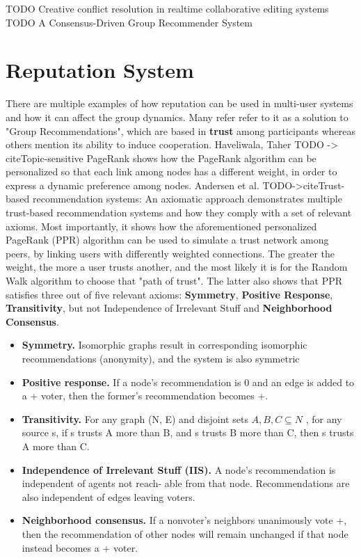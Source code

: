 TODO Creative conflict resolution in realtime collaborative editing systems
TODO A Consensus-Driven Group Recommender System

\section{Reputation System}\label{sec:rep-sys-sota}

There are multiple examples of how reputation can be used in multi-user systems and how it can affect the group dynamics. Many refer refer to it as a solution to "Group Recommendations", which are based in \textbf{trust} among participants whereas others mention its ability to induce cooperation. Haveliwala, Taher TODO -> cite{Topic-sensitive PageRank} shows how the PageRank algorithm can be personalized so that each link among nodes has a different weight, in order to express a dynamic preference among nodes. Andersen et al. TODO->cite{Trust-based recommendation systems: An axiomatic approach} demonstrates multiple trust-based recommendation systems and how they comply with a set of relevant axioms. Most importantly, it shows how the aforementioned personalized PageRank (PPR) algorithm can be used to simulate a trust network among peers, by linking users with differently weighted connections. The greater the weight, the more a user trusts another, and the most likely it is for the Random Walk algorithm to choose that "path of trust". The latter also shows that PPR satisfies three out of five relevant axioms: \textbf{Symmetry}, \textbf{Positive Response}, \textbf{Transitivity}, but not Independence of Irrelevant Stuff and \textbf{Neighborhood Consensus}.
\begin{itemize}
    \item \textbf{Symmetry.} Isomorphic graphs result in corresponding isomorphic recommendations (anonymity), and the system is also symmetric
    \item \textbf{Positive response.} If a node’s recommendation is 0 and an edge is added to a + voter, then the former’s recommendation becomes +.
    \item \textbf{Transitivity.} For any graph (N, E) and disjoint sets $ A, B, C \subseteq N $ , for any source s, if s trusts A more than B, and s trusts B more than C, then s trusts A more than C.
    \item \textbf{Independence of Irrelevant Stuﬀ (IIS).} A node’s recommendation is independent of agents not reach- able from that node. Recommendations are also independent of edges leaving voters.
    \item \textbf{Neighborhood consensus.} If a nonvoter’s neighbors unanimously vote +, then the recommendation of other nodes will remain unchanged if that node instead becomes a + voter.
\end{itemize}


